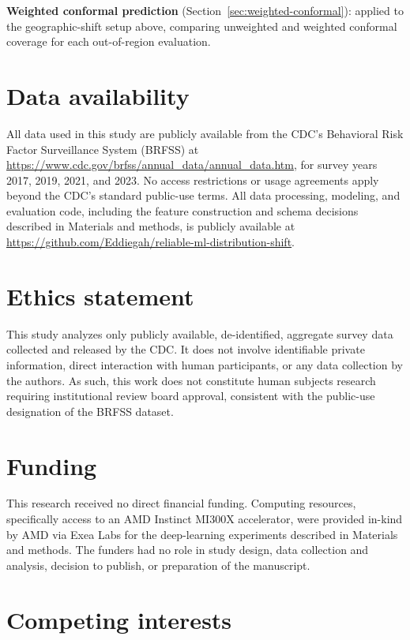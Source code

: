 \documentclass[12pt]{article}
\begin{document}
\textbf{Weighted conformal prediction} (Section~\ref{sec:weighted-conformal}): applied to the geographic-shift setup above, comparing unweighted and weighted conformal coverage for each out-of-region evaluation.

\section*{Data availability}

All data used in this study are publicly available from the CDC's Behavioral Risk Factor Surveillance System (BRFSS) at \url{https://www.cdc.gov/brfss/annual_data/annual_data.htm}, for survey years 2017, 2019, 2021, and 2023. No access restrictions or usage agreements apply beyond the CDC's standard public-use terms. All data processing, modeling, and evaluation code, including the feature construction and schema decisions described in Materials and methods, is publicly available at \url{https://github.com/Eddiegah/reliable-ml-distribution-shift}.

\section*{Ethics statement}

This study analyzes only publicly available, de-identified, aggregate survey data collected and released by the CDC. It does not involve identifiable private information, direct interaction with human participants, or any data collection by the authors. As such, this work does not constitute human subjects research requiring institutional review board approval, consistent with the public-use designation of the BRFSS dataset.

\section*{Funding}

This research received no direct financial funding. Computing resources, specifically access to an AMD Instinct MI300X accelerator, were provided in-kind by AMD via Exea Labs for the deep-learning experiments described in Materials and methods. The funders had no role in study design, data collection and analysis, decision to publish, or preparation of the manuscript.

\section*{Competing interests}
\end{document}
